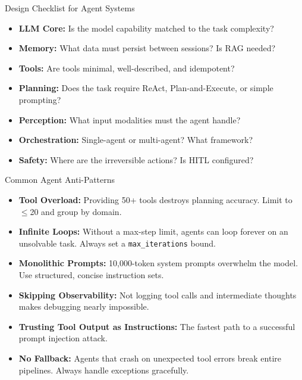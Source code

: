 \documentclass{beamer}       %
\begin{document}
\begin{frame}{Design Checklist for Agent Systems}
    \begin{itemize}
        \item[$\square$] \textbf{LLM Core:} Is the model capability matched to the task complexity?
        \item[$\square$] \textbf{Memory:} What data must persist between sessions? Is RAG needed?
        \item[$\square$] \textbf{Tools:} Are tools minimal, well-described, and idempotent?
        \item[$\square$] \textbf{Planning:} Does the task require ReAct, Plan-and-Execute, or simple prompting?
        \item[$\square$] \textbf{Perception:} What input modalities must the agent handle?
        \item[$\square$] \textbf{Orchestration:} Single-agent or multi-agent? What framework?
        \item[$\square$] \textbf{Safety:} Where are the irreversible actions? Is HITL configured?
    \end{itemize}
\end{frame}

\begin{frame}{Common Agent Anti-Patterns}
    \small
    \begin{itemize}
        \item \textbf{Tool Overload:} Providing 50+ tools destroys planning accuracy. Limit to $\leq$20 and group by domain.
        \item \textbf{Infinite Loops:} Without a max-step limit, agents can loop forever on an unsolvable task. Always set a \texttt{max\_iterations} bound.
        \item \textbf{Monolithic Prompts:} 10,000-token system prompts overwhelm the model. Use structured, concise instruction sets.
        \item \textbf{Skipping Observability:} Not logging tool calls and intermediate thoughts makes debugging nearly impossible.
        \item \textbf{Trusting Tool Output as Instructions:} The fastest path to a successful prompt injection attack.
        \item \textbf{No Fallback:} Agents that crash on unexpected tool errors break entire pipelines. Always handle exceptions gracefully.
    \end{itemize}
\end{frame}
\end{document}
